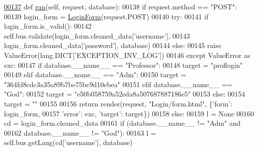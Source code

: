 \begin{DoxyCode}
\hypertarget{classLogin_1_1LoginUnit_1_1UiLogin_l00137}{}\hyperlink{classLogin_1_1LoginUnit_1_1UiLogin_a7c474f0e88183b48578c70b1781279ef}{00137}     \textcolor{keyword}{def }\hyperlink{classLogin_1_1LoginUnit_1_1UiLogin_a7c474f0e88183b48578c70b1781279ef}{run}(self, request, database):
00138         \textcolor{keywordflow}{if} request.method == \textcolor{stringliteral}{"POST"}:
00139             login\_form = \hyperlink{classLogin_1_1forms_1_1LoginForm}{LoginForm}(request.POST)
00140             \textcolor{keywordflow}{try}: 
00141                 \textcolor{keywordflow}{if} login\_form.is\_valid():
00142                     self.bus.validate(login\_form.cleaned\_data[\textcolor{stringliteral}{'username'}],
00143                         login\_form.cleaned\_data[\textcolor{stringliteral}{'password'}], database)
00144                 \textcolor{keywordflow}{else}:
00145                     \textcolor{keywordflow}{raise} ValueError(lang.DICT[\textcolor{stringliteral}{'EXCEPTION\_INV\_LOG'}])
00146             \textcolor{keywordflow}{except} ValueError \textcolor{keyword}{as} exc:
00147                 \textcolor{keywordflow}{if} database.\_\_name\_\_ == \textcolor{stringliteral}{"Professor"}:
00148                     target = \textcolor{stringliteral}{"proflogin"}
00149                 \textcolor{keywordflow}{elif} database.\_\_name\_\_ == \textcolor{stringliteral}{"Adm"}:
00150                     target = \textcolor{stringliteral}{"364fd8cdc3a35a89b7be75bc9d10ebea"}
00151                 \textcolor{keywordflow}{elif} database.\_\_name\_\_ == \textcolor{stringliteral}{"God"}:
00152                     target = \textcolor{stringliteral}{"e50b058759a52eda8a507687887186e5"}
00153                 \textcolor{keywordflow}{else}:
00154                     target = \textcolor{stringliteral}{""}
00155 
00156                 \textcolor{keywordflow}{return} render(request, \textcolor{stringliteral}{"Login/form.html"}, \{\textcolor{stringliteral}{'form'}: login\_form, 
00157                     \textcolor{stringliteral}{'error'}: exc, \textcolor{stringliteral}{'target'}: target\})
00158             \textcolor{keywordflow}{else}:
00159                 l = \textcolor{keywordtype}{None}
00160                 cd = login\_form.cleaned\_data
00161                 \textcolor{keywordflow}{if} (database.\_\_name\_\_ != \textcolor{stringliteral}{"Adm"} \textcolor{keywordflow}{and}
00162                     database.\_\_name\_\_ != \textcolor{stringliteral}{"God"}):
00163                     l = self.bus.getLang(cd[\textcolor{stringliteral}{'username'}], database)

\end{DoxyCode}
